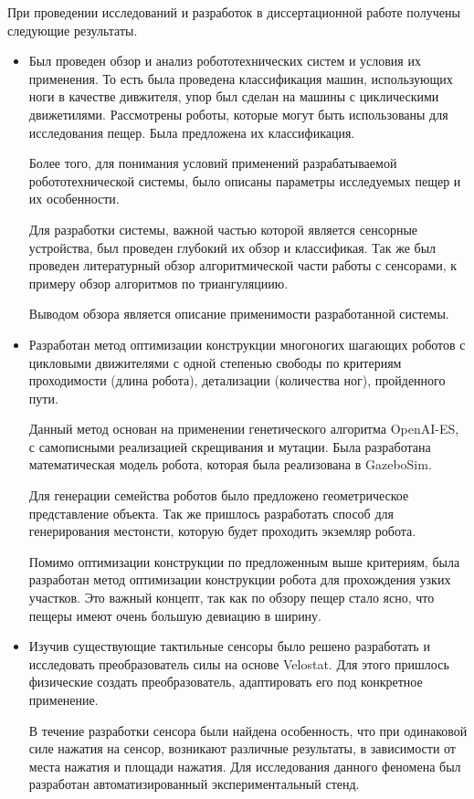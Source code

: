 При  проведении  исследований  и  разработок  в  диссертационной  работе  получены 
следующие результаты.
\begin{itemize}
  \item Был проведен обзор и анализ робототехнических систем и условия их применения. То есть была проведена классификация машин, использующих ноги в качестве дивжителя, упор был сделан на машины с циклическими движетилями. Рассмотрены роботы, которые могут быть использованы для исследования пещер. Была предложена их классификация.

  Более того, для понимания условий применений разрабатываемой робототехнической системы, было описаны параметры исследуемых пещер и их особенности.

  Для разработки системы, важной частью которой является сенсорные устройства, был проведен глубокий их обзор и классификая. Так же был проведен литературный обзор алгоритмической части работы с сенсорами, к примеру обзор алгоритмов по триангуляциию.

  Выводом обзора является описание применимости разработанной системы.
  \item Разработан метод оптимизации конструкции многоногих шагающих роботов с цикловыми движителями с одной степенью свободы по критериям проходимости (длина робота), детализации (количества ног), пройденного пути.

  Данный метод основан на применении генетического алгоритма OpenAI-ES, с самописными реализацией скрещивания и мутации. Была разработана математическая модель робота, которая была реализована в GazeboSim. 
  
  Для генерации семейства роботов было предложено геометрическое представление объекта. Так же пришлось разработать способ для генерирования местонсти, которую будет проходить экземляр робота.

  Помимо оптимизации конструкции по предложенным выше критериям, была разработан метод оптимизации конструкции робота для прохождения узких участков. Это важный концепт, так как по обзору пещер стало ясно, что пещеры имеют очень большую девиацию в ширину.
  \item Изучив существующие тактильные сенсоры было решено разработать и исследовать преобразователь силы на основе Velostat. Для этого пришлось физические создать преобразователь, адаптировать его под конкретное применение.

  В течение разработки сенсора были найдена особенность, что при одинаковой силе нажатия на сенсор, возникают различные результаты, в зависимости от места нажатия и площади нажатия. Для исследования данного феномена был разработан автоматизированный экспериментальный стенд. 
  

\end{itemize}
